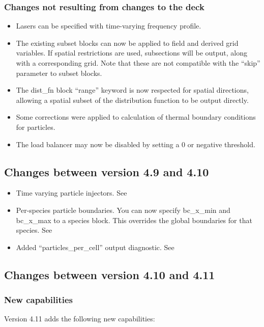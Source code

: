 \subsubsection{Changes not resulting from changes to the deck}
\begin{itemize}
\item Lasers can be specified with time-varying frequency profile.
\item The existing subset blocks can now be applied to field and derived grid
  variables. If spatial restrictions are used, subsections will be output,
  along with a corresponding grid.
  Note that these are not compatible with the ``skip'' parameter to subset
  blocks.
\item The dist\_fn block ``range'' keyword is now respected for spatial
  directions, allowing a spatial subset of the distribution function to be
  output directly.
\item Some corrections were applied to calculation of thermal boundary
  conditions for particles.
\item The load balancer may now be disabled by setting a 0 or negative
  threshold.
\end{itemize}
\bigskip


\subsection{Changes between version 4.9 and 4.10}

\begin{itemize}
\item Time varying particle injectors. See 
\item Per-species particle boundaries. You can now specify bc\_x\_min and
   bc\_x\_max to a species block. This overrides the global boundaries for that
   species. See 
\item Added ``particles\_per\_cell'' output diagnostic.
   See 
\end{itemize}
\bigskip


\subsection{Changes between version 4.10 and 4.11}

\subsubsection{New capabilities}
Version 4.11 adds the following new capabilities:

